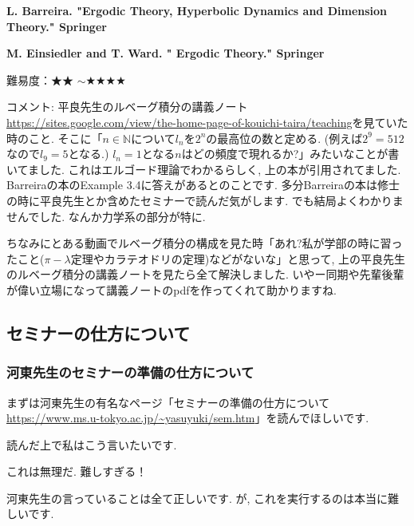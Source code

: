 \textbf{L. Barreira. "Ergodic Theory, Hyperbolic Dynamics and Dimension Theory." Springer}　\vspace{-6pt} 

\textbf{M. Einsiedler and T. Ward. " Ergodic Theory." Springer }  　\vspace{-6pt} 

難易度：★★ $\sim$★★★★\vspace{-6pt} 

コメント: 平良先生のルベーグ積分の講義ノート\url{https://sites.google.com/view/the-home-page-of-kouichi-taira/teaching}を見ていた時のこと. 
そこに「$n \in \mathbb{N}$について$l_n$を$2^{n}$の最高位の数と定める. (例えば$2^9=512$なので$l_9=5$となる.) $l_n=1$となる$n$はどの頻度で現れるか?」みたいなことが書いてました.
これはエルゴード理論でわかるらしく, 上の本が引用されてました. 
Barreiraの本のExample 3.4に答えがあるとのことです. 
多分Barreiraの本は修士の時に平良先生とか含めたセミナーで読んだ気がします. でも結局よくわかりませんでした. なんか力学系の部分が特に. 

ちなみにとある動画でルベーグ積分の構成を見た時「あれ?私が学部の時に習ったこと($\pi-\lambda$定理やカラテオドリの定理)などがないな」と思って, 上の平良先生のルベーグ積分の講義ノートを見たら全て解決しました. いやー同期や先輩後輩が偉い立場になって講義ノートのpdfを作ってくれて助かりますね. 

\vspace{8pt}


\subsection{セミナーの仕方について}
\label{subsec-seminar}
\subsubsection{河東先生のセミナーの準備の仕方について}
まずは河東先生の有名なページ「セミナーの準備の仕方について \url{https://www.ms.u-tokyo.ac.jp/~yasuyuki/sem.htm}」を読んでほしいです.

読んだ上で私はこう言いたいです. 
\begin{tcolorbox}[mybox]
\begin{center}
これは無理だ. 難しすぎる！
\end{center}
\end{tcolorbox}
河東先生の言っていることは全て正しいです. 
が, これを実行するのは本当に難しいです. 

